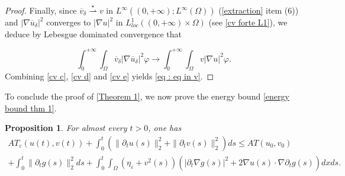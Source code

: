 \documentclass[reqno,12pt,twoside]{amsart}
\newtheorem{proposition}{Proposition}[section]
\numberwithin{equation}{section} \numberwithin{theorem}{section}
\numberwithin{proposition}{section} \numberwithin{lemma}{section}
\numberwithin{corollary}{section}
\numberwithin{definition}{section} \numberwithin{remark}{section}
\begin{document}
\begin{proof}
Finally, since $\overline{v}_\delta \overset{\star}{\rightharpoonup} v$ in $L^\infty((0,+\infty); L^{\infty}(\Omega))$ (\autoref{extraction} item (6)) and  $|\nabla \overline{u}_\delta |^2$ converges to $|\nabla u|^2$ in $L_{loc}^1((0,+\infty)\times \Omega)$ (see \eqref{cv forte L1}), we deduce by Lebesgue dominated convergence that 

\begin{equation}\label{cv e}
\int_0^{+\infty} \int_\Omega  \overline{v}_\delta |\nabla \overline{u}_\delta |^2 \varphi \rightarrow \int_0^{+\infty} \int_\Omega v|\nabla u|^2 \varphi.
\end{equation}
Combining \eqref{cv c}, \eqref{cv d} and \eqref{cv e} yields \eqref{eq : eq in v}. 
\end{proof}

To conclude the proof of \autoref{Theorem 1}, we now prove the energy bound \eqref{energy bound thm 1}. 

\begin{proposition}
For almost every $t >0$, one has 
\begin{multline*}
AT_\varepsilon (u(t), v(t)) + \int_0^t \left(\|\partial_t u(s)\|_2^2 +\|\partial_t v(s)\|_2^2 \right) ds \leqslant AT(u_0, v_0)\\
 + \int_0^t \|\partial_t g(s)\|_2^2 ds + \int_0^t\int_\Omega (\eta_\varepsilon + v^2(s)) \left(|\partial_t \nabla g(s)|^2 + 2 \nabla u(s) \cdot \nabla \partial_t g(s)\right) dxds.
\end{multline*}
\end{proposition}
\end{document}
